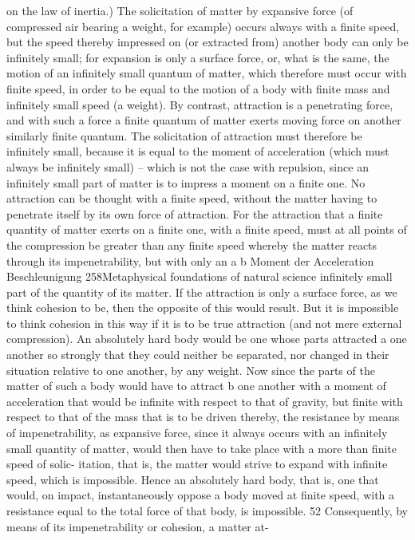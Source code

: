 on the law of inertia.) The solicitation of matter by expansive force
(of compressed air bearing a weight, for example) occurs always with
a ﬁnite speed, but the speed thereby impressed on (or extracted from)
another body can only be inﬁnitely small; for expansion is only a surface
force, or, what is the same, the motion of an inﬁnitely small quantum
of matter, which therefore must occur with ﬁnite speed, in order to
be equal to the motion of a body with ﬁnite mass and inﬁnitely small
speed (a weight). By contrast, attraction is a penetrating force, and with
such a force a ﬁnite quantum of matter exerts moving force on another
similarly ﬁnite quantum. The solicitation of attraction must therefore be
inﬁnitely small, because it is equal to the moment of acceleration (which
must always be inﬁnitely small) – which is not the case with repulsion,
since an inﬁnitely small part of matter is to impress a moment on a ﬁnite
one. No attraction can be thought with a ﬁnite speed, without the matter
having to penetrate itself by its own force of attraction. For the attraction
that a ﬁnite quantity of matter exerts on a ﬁnite one, with a ﬁnite speed,
must at all points of the compression be greater than any ﬁnite speed
whereby the matter reacts through its impenetrability, but with only an
a
b
Moment der Acceleration
Beschleunigung
258Metaphysical foundations of natural science
inﬁnitely small part of the quantity of its matter. If the attraction is only a
surface force, as we think cohesion to be, then the opposite of this would
result. But it is impossible to think cohesion in this way if it is to be true
attraction (and not mere external compression).
An absolutely hard body would be one whose parts attracted a one
another so strongly that they could neither be separated, nor changed
in their situation relative to one another, by any weight. Now since the
parts of the matter of such a body would have to attract b one another
with a moment of acceleration that would be inﬁnite with respect to
that of gravity, but ﬁnite with respect to that of the mass that is to be
driven thereby, the resistance by means of impenetrability, as expansive
force, since it always occurs with an inﬁnitely small quantity of matter,
would then have to take place with a more than ﬁnite speed of solic-
itation, that is, the matter would strive to expand with inﬁnite speed,
which is impossible. Hence an absolutely hard body, that is, one that
would, on impact, instantaneously oppose a body moved at ﬁnite speed,
with a resistance equal to the total force of that body, is impossible. 52
Consequently, by means of its impenetrability or cohesion, a matter at-

